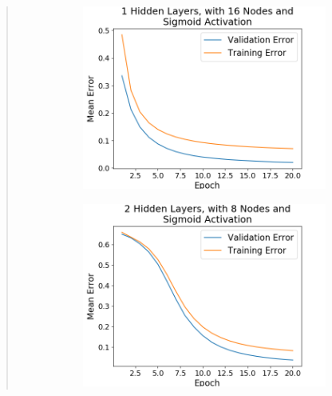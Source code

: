 \documentclass{article}
\begin{document}
\begin{quote}
\begin{figure}[h!]
\begin{subfigure}[h]{0.23\textwidth}
	\includegraphics[width=\textwidth]{figs/Cancer_Binary_Classification_1_Hidden_Layers_with_16_Nodes_and_Sigmoid_Activation.png}
\end{subfigure}
%
\begin{subfigure}[h]{0.23\textwidth}
	\includegraphics[width=\textwidth]{figs/Cancer_Binary_Classification_2_Hidden_Layers_with_8_Nodes_and_Sigmoid_Activation.png}
\end{subfigure}
%
\begin{subfigure}[h]{0.23\textwidth}

\end{subfigure}
\end{figure}
\end{quote}
\end{document}
